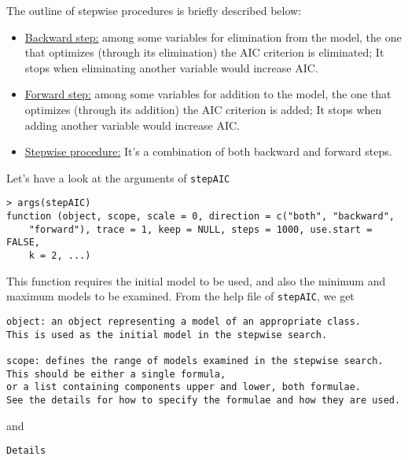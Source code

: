 \begin{enumerate}[(a)]
\begin{enumerate}[Step 1:]
\begin{enumerate}[(i)]
The outline of stepwise procedures is briefly described below: 
\begin{itemize}
\item \underline{Backward step:} among some variables for elimination from the model, the one that optimizes (through its elimination) the AIC criterion is eliminated; It stops when eliminating another variable would increase AIC.
\item \underline{Forward step:} among some variables for addition to the model, the one that optimizes (through its addition) the AIC criterion is added; It stops when adding another variable would increase AIC.
\item \underline{Stepwise procedure:} It's a combination of both backward and forward steps.
\end{itemize}
Let's have a look at the arguments of \verb|stepAIC|
\begin{spacing}{1.2}
\begin{footnotesize}
\begin{verbatim}
> args(stepAIC)
function (object, scope, scale = 0, direction = c("both", "backward", 
    "forward"), trace = 1, keep = NULL, steps = 1000, use.start = FALSE, 
    k = 2, ...) 
\end{verbatim}
\end{footnotesize}
\end{spacing}
This function requires the initial model to be used, and also the minimum and maximum models to be examined. From the help file of \verb|stepAIC|, we get
\begin{spacing}{1.2}
\begin{footnotesize}
\begin{verbatim}
object: an object representing a model of an appropriate class. 
This is used as the initial model in the stepwise search.

scope: defines the range of models examined in the stepwise search. 
This should be either a single formula, 
or a list containing components upper and lower, both formulae. 
See the details for how to specify the formulae and how they are used.
\end{verbatim}
\end{footnotesize}
\end{spacing}
and 
\begin{spacing}{1.2}
\begin{footnotesize}
\begin{verbatim}
Details


\end{verbatim}
\end{footnotesize}
\end{spacing}
\end{enumerate}
\end{enumerate}
\end{enumerate}
